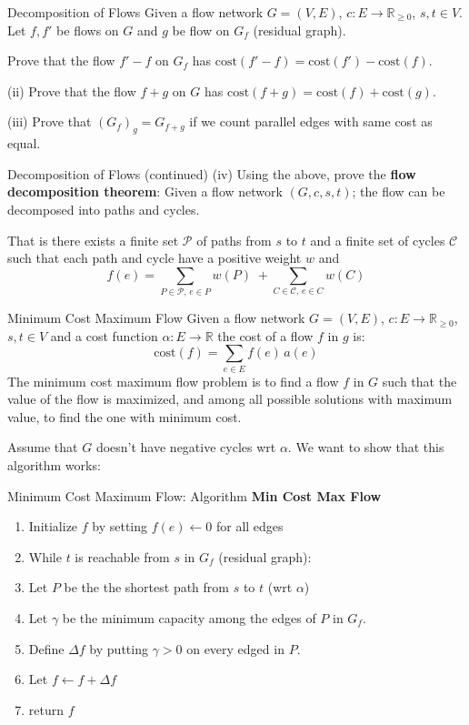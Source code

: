 \documentclass[aspectratio=169,11pt]{beamer}
\newcommand{\blankslides}{%
  \begin{frame}[plain]\end{frame}%
  \begin{frame}[plain]\end{frame}%
}
\begin{document}
\begin{frame}{Decomposition of Flows}
Given a flow network $G=(V,E)$, $c:E\to\mathbb{R}_{\ge 0}$, $s,t\in V$. Let $f,f'$ be flows on $G$ and
$g$ be flow on $G_f$ (residual graph).

\medskip
Prove that the flow $f'-f$ on $G_f$ has $\mathrm{cost}(f'-f)=\mathrm{cost}(f')-\mathrm{cost}(f)$.

\medskip
(ii) Prove that the flow $f+g$ on $G$ has $\mathrm{cost}(f+g)=\mathrm{cost}(f)+\mathrm{cost}(g)$.

\medskip
(iii) Prove that $(G_f)_g=G_{f+g}$ if we count parallel edges with same cost as equal.
\end{frame}

\begin{frame}{Decomposition of Flows (continued)}
(iv) Using the above, prove the \textbf{flow decomposition theorem}: Given a flow network $(G,c,s,t)$;
the flow can be decomposed into paths and cycles.

\medskip
That is there exists a finite set $\mathcal{P}$ of paths from $s$ to $t$ and a finite set of cycles
$\mathcal{C}$ such that each path and cycle have a positive weight $w$ and
\[
  f(e)=\sum_{P\in\mathcal{P},\,e\in P} w(P)\;+\sum_{C\in\mathcal{C},\,e\in C} w(C)
\]
\end{frame}
\blankslides

\begin{frame}{Minimum Cost Maximum Flow}
Given a flow network $G=(V,E)$, $c:E\to\mathbb{R}_{\ge0}$, $s,t\in V$ and a cost function
$\alpha:E\to\mathbb{R}$ the cost of a flow $f$ in $g$ is:
\[
  \mathrm{cost}(f)=\sum_{e\in E} f(e)\,a(e)
\]
The minimum cost maximum flow problem is to find a flow $f$ in $G$ such that the value of the flow is
maximized, and among all possible solutions with maximum value, to find the one with minimum cost.

\medskip
Assume that $G$ doesn't have negative cycles wrt $\alpha$. We want to show that this algorithm works:
\end{frame}

\begin{frame}{Minimum Cost Maximum Flow: Algorithm}
\textbf{Min Cost Max Flow}
\begin{enumerate}
  \item Initialize $f$ by setting $f(e)\leftarrow 0$ for all edges
  \item While $t$ is reachable from $s$ in $G_f$ (residual graph):
  \item[3] \quad Let $P$ be the the shortest path from $s$ to $t$ (wrt $\alpha$)
  \item[4] \quad Let $\gamma$ be the minimum capacity among the edges of $P$ in $G_f$.
  \item[5] \quad Define $\Delta f$ by putting $\gamma>0$ on every edged in $P$.
  \item[6] \quad Let $f\leftarrow f+\Delta f$
  \item[7] return $f$
\end{enumerate}
\end{frame}
\end{document}
